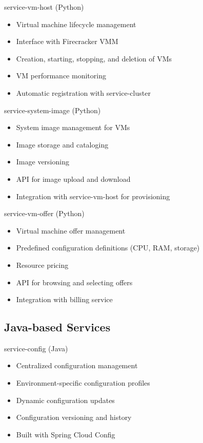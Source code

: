 \documentclass{beamer}
\begin{document}
\begin{frame}{service-vm-host (Python)}
  \begin{itemize}
    \item Virtual machine lifecycle management
    \item Interface with Firecracker VMM
    \item Creation, starting, stopping, and deletion of VMs
    \item VM performance monitoring
    \item Automatic registration with service-cluster
  \end{itemize}
\end{frame}

\begin{frame}{service-system-image (Python)}
  \begin{itemize}
    \item System image management for VMs
    \item Image storage and cataloging
    \item Image versioning
    \item API for image upload and download
    \item Integration with service-vm-host for provisioning
  \end{itemize}
\end{frame}

\begin{frame}{service-vm-offer (Python)}
  \begin{itemize}
    \item Virtual machine offer management
    \item Predefined configuration definitions (CPU, RAM, storage)
    \item Resource pricing
    \item API for browsing and selecting offers
    \item Integration with billing service
  \end{itemize}
\end{frame}

\subsection{Java-based Services}

\begin{frame}{service-config (Java)}
  \begin{itemize}
    \item Centralized configuration management
    \item Environment-specific configuration profiles
    \item Dynamic configuration updates
    \item Configuration versioning and history
    \item Built with Spring Cloud Config
  \end{itemize}
\end{frame}
\end{document}
